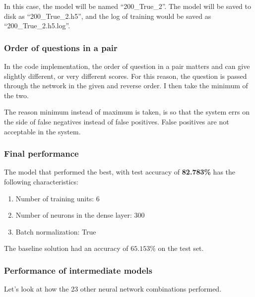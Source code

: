 \documentclass{article}
\begin{document}
In this case, the model will be named ``200\_True\_2''. The model will be saved to disk as ``200\_True\_2.h5'', and the log of training would be saved as ``200\_True\_2.h5.log''.

\subsubsection{Order of questions in a pair}

In the code implementation, the order of question in a pair matters and can give slightly different, or very different scores. For this reason, the question is passed through the network in the given and reverse order. I then take the minimum of the two.

The reason minimum instead of maximum is taken, is so that the system errs on the side of false negatives instead of false positives. False positives are not acceptable in the system.

\subsubsection{Final performance}

The model that performed the best, with test accuracy of \textbf{82.783\%} has the following characteristics:

\begin{enumerate}
\item{Number of training units: 6}
\item{Number of neurons in the dense layer: 300}
\item{Batch normalization: True}
\end{enumerate}

The baseline solution had an accuracy of $65.153\%$ on the test set.

\subsubsection{Performance of intermediate models}

Let's look at how the 23 other neural network combinations performed.
\end{document}
